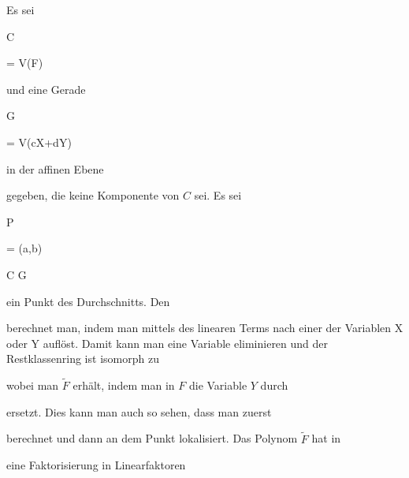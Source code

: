 {


Es sei


\mavergleichskette

{\vergleichskette

{C
}

{ = }{ V(F)
}

{  }{
}

{    }{
}

{   }{
}

}
{}{}{}
und eine Gerade


\mavergleichskette

{\vergleichskette

{G
}

{ = }{ V(cX+dY)
}

{  }{
}

{    }{
}

{   }{
}

}
{}{}{}
in der affinen Ebene

 gegeben, die keine Komponente von $C$ sei. Es sei


\mavergleichskette

{\vergleichskette

{P
}

{ = }{ (a,b)
}

{ \in }{ C \cap G
}

{    }{
}

{   }{
}

}
{}{}{}
ein Punkt des Durchschnitts. Den


 {  }


berechnet man, indem man mittels des linearen Terms nach einer der Variablen
\mathkor {} {X} {oder} {Y} {}
auflöst. Damit kann man eine Variable eliminieren und der Restklassenring ist isomorph zu

 wobei man $\tilde{F}$ erhält, indem man in $F$ die Variable $Y$ durch

 ersetzt. Dies kann man auch so sehen, dass man zuerst

 berechnet und dann an dem Punkt lokalisiert. Das Polynom $\tilde{F}$ hat in

 eine Faktorisierung in Linearfaktoren
 {} {}


\mavergleichskettedisp

{\vergleichskette

}}
